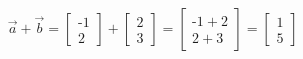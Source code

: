 \documentclass[preview]{standalone}
\begin{document}
\begin{align*}
\vec{a} + \vec{b} = \begin{bmatrix} \text{-}1 \\ 2 \end{bmatrix} + \begin{bmatrix} 2 \\ 3 \end{bmatrix} = \begin{bmatrix} \text{-}1 + 2 \\ 2 + 3 \end{bmatrix} = \begin{bmatrix} 1 \\ 5 \end{bmatrix}
\end{align*}
\end{document}
